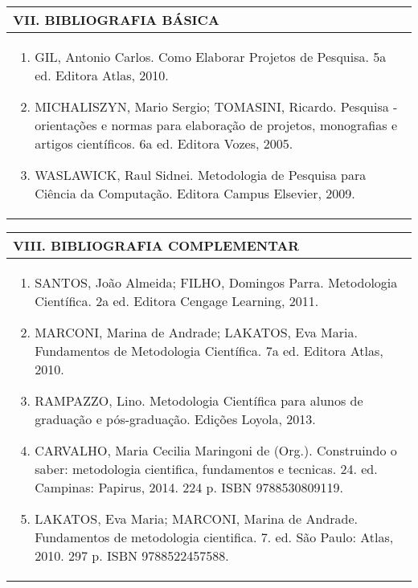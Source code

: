 \documentclass[12pt]{article}
\begin{document}
\newpage


\begin{longtable}{|L{1.025\textwidth}|} \hline
%
{\bf VII. BIBLIOGRAFIA BÁSICA} \\ \hline

\begin{enumerate}
\item GIL, Antonio Carlos. Como Elaborar Projetos de Pesquisa. 5a ed. Editora Atlas, 2010. 
\item MICHALISZYN, Mario Sergio; TOMASINI, Ricardo. Pesquisa - orientações e normas para elaboração de projetos, monografias e artigos científicos. 6a ed. Editora Vozes, 2005. 
\item WASLAWICK, Raul Sidnei. Metodologia de Pesquisa para Ciência da Computação. Editora Campus Elsevier, 2009.
\end{enumerate}

 \\ \hline
\end{longtable}



\begin{longtable}{|L{1.025\textwidth}|} \hline
%
{\bf VIII. BIBLIOGRAFIA COMPLEMENTAR} \\ \hline
\begin{enumerate}
\item SANTOS, João Almeida; FILHO, Domingos Parra. Metodologia Científica. 2a ed. Editora Cengage Learning, 2011. 
\item MARCONI, Marina de Andrade; LAKATOS, Eva Maria. Fundamentos de Metodologia Científica. 7a ed. Editora Atlas, 2010. 
\item RAMPAZZO, Lino. Metodologia Científica para alunos de graduação e pós-graduação. Edições Loyola, 2013.
\item CARVALHO, Maria Cecilia Maringoni de (Org.). Construindo o saber: metodologia cientifica, fundamentos e tecnicas. 24. ed. Campinas: Papirus, 2014. 224 p. ISBN 9788530809119.
\item LAKATOS, Eva Maria; MARCONI, Marina de Andrade. Fundamentos de metodologia cientifica. 7. ed. São Paulo: Atlas, 2010. 297 p. ISBN 9788522457588.
%
\end{enumerate}
 \\ \hline
\end{longtable}



\end{document}
